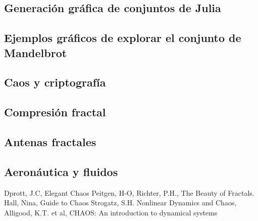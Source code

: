 \subsection{Generación gráfica de conjuntos de Julia}
\subsection{Ejemplos gráficos de explorar el conjunto de Mandelbrot}
\subsection{Caos y criptografía}
\subsection{Compresión fractal}
\subsection{Antenas fractales}
\subsection{Aeronáutica y fluidos}

\newpage

\begin{thebibliography}{1}
Dprott, J.C, Elegant Chaos
Peitgen, H-O, Richter, P.H., The Beauty of Fractals.
Hall, Nina, Guide to Chaos
Strogatz, S.H. Nonlinear Dynamics and Chaos,
Alligood, K.T. et al, CHAOS: An introduction to dynamical systems
\end{thebibliography}

